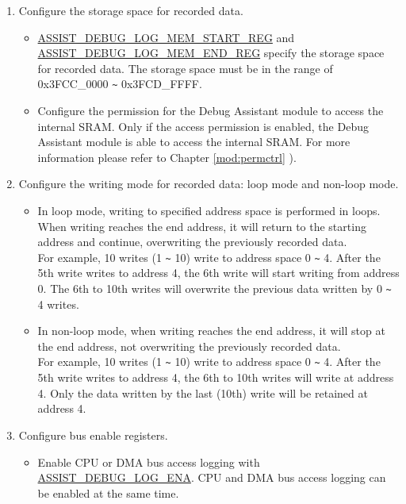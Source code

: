 \documentclass[main\_\_EN.tex]{subfiles}
\begin{document}
\begin{enumerate}
\item Configure the storage space for recorded data.
        \begin{itemize}
            \item \hyperref[regdesc:ASSISTDEBUGLOGMEMSTARTREG]{ASSIST\_DEBUG\_LOG\_MEM\_START\_REG} and \hyperref[regdesc:ASSISTDEBUGLOGMEMENDREG]{ASSIST\_DEBUG\_LOG\_MEM\_END\_REG} specify the storage space for recorded data. The storage space must be in the range of 0x3FCC\_0000 \verb+~+ 0x3FCD\_FFFF.
            \item Configure the permission for the Debug Assistant module to access the internal SRAM. Only if the access permission is enabled, the Debug Assistant module is able to access the internal SRAM. For more information please refer to Chapter \ref{mod:permctrl} \textit{}).
        \end{itemize}
        
\item Configure the writing mode for recorded data: loop mode and non-loop mode.
        \begin{itemize}
            \item In loop mode, writing to specified address space is performed in loops. When writing reaches the end address, it will return to the starting address and continue, overwriting the previously recorded data.\\
            For example, 10 writes (1 \verb+~+ 10) write to address space 0 \verb+~+ 4. After the 5th write writes to address 4, the 6th write will start writing from address 0. The 6th to 10th writes will overwrite the previous data written by 0 \verb+~+ 4 writes.
            \item In non-loop mode, when writing reaches the end address, it will stop at the end address, not overwriting the previously recorded data.\\
            For example, 10 writes (1 \verb+~+ 10) write to address space 0 \verb+~+ 4. After the 5th write writes to address 4, the 6th to 10th writes will write at address 4. Only the data written by the last (10th) write will be retained at address 4.
        \end{itemize}

\item Configure bus enable registers.
        \begin{itemize}
            \item Enable CPU or DMA bus access logging with \hyperref[fielddesc:ASSISTDEBUGLOGENA]{ASSIST\_DEBUG\_LOG\_ENA}. CPU and DMA bus access logging can be enabled at the same time.
        \end{itemize}
\end{enumerate}
\end{document}
